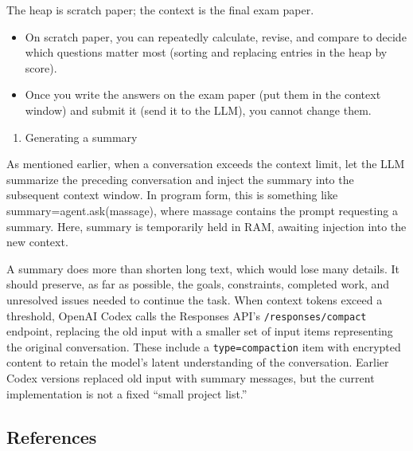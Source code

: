 The heap is scratch paper; the context is the final exam paper.

\begin{itemize}
\tightlist
\item
  On scratch paper, you can repeatedly calculate, revise, and compare to decide which questions matter most (sorting and replacing entries in the heap by score).
\item
  Once you write the answers on the exam paper (put them in the context window) and submit it (send it to the LLM), you cannot change them.
\end{itemize}

\begin{enumerate}
\def\labelenumi{\arabic{enumi}.}
\setcounter{enumi}{1}
\tightlist
\item
  Generating a summary
\end{enumerate}

As mentioned earlier, when a conversation exceeds the context limit, let the LLM summarize the preceding conversation and inject the summary into the subsequent context window. In program form, this is something like summary=agent.ask(massage), where massage contains the prompt requesting a summary. Here, summary is temporarily held in RAM, awaiting injection into the new context.

A summary does more than shorten long text, which would lose many details. It should preserve, as far as possible, the goals, constraints, completed work, and unresolved issues needed to continue the task. When context tokens exceed a threshold, OpenAI Codex calls the Responses API's \texttt{/responses/compact} endpoint, replacing the old input with a smaller set of input items representing the original conversation. These include a \texttt{type=compaction} item with encrypted content to retain the model's latent understanding of the conversation. Earlier Codex versions replaced old input with summary messages, but the current implementation is not a fixed ``small project list.''

\FloatBarrier
{}
\hypertarget{references-126}{%
\subsection{References}\label{references-126}}

